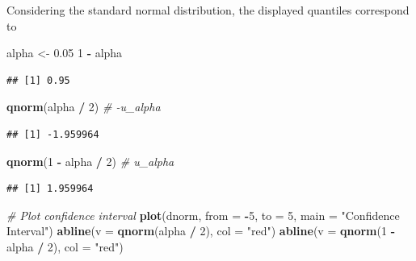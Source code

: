 \documentclass[
]{article}
\newenvironment{Shaded}{\begin{snugshade}}{\end{snugshade}}
\newcommand{\AttributeTok}[1]{\textcolor[rgb]{0.13,0.29,0.53}{#1}}
\newcommand{\CommentTok}[1]{\textcolor[rgb]{0.56,0.35,0.01}{\textit{#1}}}
\newcommand{\DecValTok}[1]{\textcolor[rgb]{0.00,0.00,0.81}{#1}}
\newcommand{\FloatTok}[1]{\textcolor[rgb]{0.00,0.00,0.81}{#1}}
\newcommand{\FunctionTok}[1]{\textcolor[rgb]{0.13,0.29,0.53}{\textbf{#1}}}
\newcommand{\NormalTok}[1]{#1}
\newcommand{\OtherTok}[1]{\textcolor[rgb]{0.56,0.35,0.01}{#1}}
\newcommand{\SpecialCharTok}[1]{\textcolor[rgb]{0.81,0.36,0.00}{\textbf{#1}}}
\newcommand{\StringTok}[1]{\textcolor[rgb]{0.31,0.60,0.02}{#1}}
\begin{document}
Considering the standard normal distribution, the displayed quantiles
correspond to

\begin{Shaded}
\begin{Highlighting}[]
\NormalTok{alpha }\OtherTok{\textless{}{-}} \FloatTok{0.05}
\DecValTok{1} \SpecialCharTok{{-}}\NormalTok{ alpha}
\end{Highlighting}
\end{Shaded}

\begin{verbatim}
## [1] 0.95
\end{verbatim}

\begin{Shaded}
\begin{Highlighting}[]
\FunctionTok{qnorm}\NormalTok{(alpha }\SpecialCharTok{/} \DecValTok{2}\NormalTok{) }\CommentTok{\# {-}u\_alpha}
\end{Highlighting}
\end{Shaded}

\begin{verbatim}
## [1] -1.959964
\end{verbatim}

\begin{Shaded}
\begin{Highlighting}[]
\FunctionTok{qnorm}\NormalTok{(}\DecValTok{1} \SpecialCharTok{{-}}\NormalTok{ alpha }\SpecialCharTok{/} \DecValTok{2}\NormalTok{) }\CommentTok{\# u\_alpha}
\end{Highlighting}
\end{Shaded}

\begin{verbatim}
## [1] 1.959964
\end{verbatim}

\begin{Shaded}
\begin{Highlighting}[]
\CommentTok{\# Plot confidence interval}
\FunctionTok{plot}\NormalTok{(dnorm, }\AttributeTok{from =} \SpecialCharTok{{-}}\DecValTok{5}\NormalTok{, }\AttributeTok{to =} \DecValTok{5}\NormalTok{, }\AttributeTok{main =} \StringTok{"Confidence Interval"}\NormalTok{)}
\FunctionTok{abline}\NormalTok{(}\AttributeTok{v =} \FunctionTok{qnorm}\NormalTok{(alpha }\SpecialCharTok{/} \DecValTok{2}\NormalTok{), }\AttributeTok{col =} \StringTok{"red"}\NormalTok{)}
\FunctionTok{abline}\NormalTok{(}\AttributeTok{v =} \FunctionTok{qnorm}\NormalTok{(}\DecValTok{1} \SpecialCharTok{{-}}\NormalTok{ alpha }\SpecialCharTok{/} \DecValTok{2}\NormalTok{), }\AttributeTok{col =} \StringTok{"red"}\NormalTok{)}
\end{Highlighting}
\end{Shaded}
\end{document}
